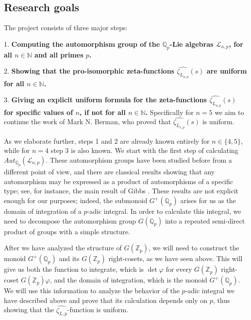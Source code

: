 \documentclass[12pt]{article}
\begin{document}
\subsection{Research goals}
The project consists of three major steps:\par
1. \textbf{Computing the automorphism group of the $\mathbb{Q}_p$-Lie algebras $\mathcal{L}_{n,p}$, for all $n\in\mathbb{N}$ and all primes $p$.}\par
2. \textbf{Showing that the pro-isomorphic zeta-functions $\hat{\zeta_{L_{n,p}}}(s)$ are uniform for all $n\in\mathbb{N}$.}\par
3. \textbf{Giving an explicit uniform formula for the zeta-functions $\hat{\zeta_{L_{n,p}}}(s)$ for specific values of $n$, if not for all $n\in\mathbb{N}$.}
Specifically for $n=5$ we aim to continue the work of Mark N. Berman, who proved that $\hat{\zeta_{L_{5,p}}}(s)$ is uniform.\par
As we elaborate further, steps 1 and 2 are already known entirely for $n\in\{4,5\}$, while for $n=4$ step 3 is also known.
We start with the first step of calculating $Aut_{\mathbb{Q}_p}(\mathcal{L}_{n,p})$. These automorphism groups have been studied before from a different point of view, and there are classical results showing that any automorphism may be expressed as a product of automorphisms of a specific type; see, for instance, the main result of Gibbs \cite{Gibbs}.  These results are not explicit enough for our purposes; indeed, the submonoid $G^+(\mathbb{Q}_p)$ arises for us as the domain of integration of a $p$-adic integral.  In order to calculate this integral, we need to decompose the automorphism group $G(\mathbb{Q}_p)$ into a repeated semi-direct product of groups with a simple structure.
\par
After we have analyzed the structure of $G(\mathbb{Z}_p)$, we will need to construct the monoid $G^+(\mathbb{Q}_p)$ and its $G(\mathbb{Z}_p)$ right-cosets, as we have seen above. This will give us both the function to integrate, which is $\det\varphi$ for every $G(\mathbb{Z}_p)$ right-coset $G(\mathbb{Z}_p)\varphi$, and the domain of integration, which is the monoid $G^+(\mathbb{Q}_p)$. We will use this information to analyze the behavior of the $p$-adic integral we have described above and prove that its calculation depends only on $p$, thus showing that the $\hat{\zeta_{L,p}}$-function is uniform.
\end{document}
